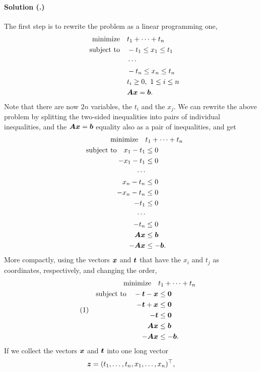 \documentclass{article}
\newcounter{problemSheetNumber}
\newcounter{problems}
\renewcommand{\solution}[1]{\paragraph{Solution (\theproblemSheetNumber.\theproblems)}\addtocounter{problems}{1}\label{#1}}
\begin{document}
\solution{pr3} The first step is to rewrite the problem as a linear programming one,
\begin{align*}
\text{minimize}\quad & t_1+\cdots +t_n\\
\quad\text{subject to}\quad & -t_1\leq x_1\leq t_1\\
& \cdots\\
& -t_n\leq x_n\leq t_n\\
& t_i\geq 0, \ 1\leq i\leq n\\
& \bm{A}\bm{x}=\bm{b}.
\end{align*}
Note that there are now $2n$ variables, the $t_i$ and the $x_j$. We can rewrite the above problem by splitting the two-sided inequalities into pairs of individual inequalities, and the $\bm{A}\bm{x}=\bm{b}$ equality also as a pair of inequalities, and get
\begin{align*}
\text{minimize}\quad & t_1+\cdots +t_n\\
\quad\text{subject to}\quad x_1-t_1&\leq 0\\
  -x_1-t_1 &\leq 0\\
  \cdots &\\
  x_n-t_n&\leq 0\\
  -x_n-t_n &\leq 0\\
  -t_1&\leq 0\\
  \cdots &\\
  -t_n&\leq 0\\
  \bm{A}\bm{x}&\leq \bm{b}\\
  -\bm{A}\bm{x} &\leq -\bm{b}.
\end{align*}
More compactly, using the vectors $\bm{x}$ and $\bm{t}$ that have the $x_i$ and $t_j$ as coordinates, respectively, and changing the order,
\begin{align}\label{eq:easy}\tag{1}
\begin{split}
 \text{minimize}\quad & t_1+\cdots +t_n\\
 \quad\text{subject to}\quad  -\bm{t}-\bm{x} & \leq \bm{0}\\
          -\bm{t}+\bm{x} & \leq \bm{0}\\
          -\bm{t}&\leq \bm{0}\\
          \bm{A}\bm{x} & \leq \bm{b}\\
          -\bm{A}\bm{x}& \leq -\bm{b}.
\end{split}
\end{align}
If we collect the vectors $\bm{x}$ and $\bm{t}$ into one long vector
\begin{equation*}
 \bm{z} = (t_1,\dots,t_n,x_1,\dots,x_n)^{\top},
\end{equation*}
\end{document}
